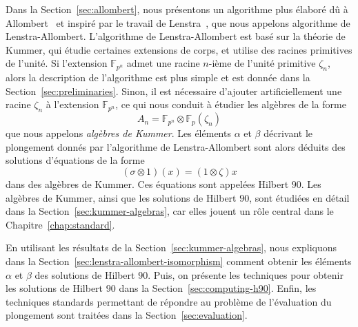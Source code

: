 Dans la Section~\ref{sec:allombert}, nous présentons un algorithme plus élaboré
dû à Allombert~\cite{Allombert02} et inspiré par le travail de
Lenstra~\cite{Lenstra91}, que nous appelons algorithme de Lenstra-Allombert.
L'algorithme de Lenstra-Allombert est basé sur la théorie de Kummer, qui étudie
certaines extensions de corps, et utilise des racines primitives de l'unité. Si
l'extension $\mathbb{F}_{p^{n}}$ admet une racine $n$-ième de l'unité primitive
$\zeta_n$,
alors la description de l'algorithme est plus simple et est donnée dans la
Section~\ref{sec:preliminaries}. Sinon, il est nécessaire d'ajouter
artificiellement une racine $\zeta_n$ à l'extension $\mathbb{F}_{p^{n}}$, ce qui
nous conduit à étudier les algèbres de la forme
\[
  A_n = \mathbb{F}_{p^{n}}\otimes\mathbb{F}_p(\zeta_n)
\]
que nous appelons \emph{algèbres de Kummer}. Les éléments $\alpha$ et $\beta$
décrivant le plongement donnés par l'algorithme de Lenstra-Allombert sont alors
déduits des solutions d'équations de la forme
\[
  (\sigma\otimes1)(x) = (1\otimes\zeta)x
\]
dans des algèbres de Kummer. Ces équations sont appelées Hilbert $90$. Les
algèbres de Kummer, ainsi que les solutions de Hilbert $90$, sont étudiées en
détail dans la Section~\ref{sec:kummer-algebras}, car elles jouent un rôle
central dans le Chapitre~\ref{chap:standard}.

En utilisant les résultats de la Section~\ref{sec:kummer-algebras}, nous
expliquons dans la Section~\ref{sec:lenstra-allombert-isomorphism} comment
obtenir les éléments $\alpha$ et $\beta$ des solutions de Hilbert $90$. Puis,
on présente les techniques pour obtenir les solutions de Hilbert $90$ dans la
Section~\ref{sec:computing-h90}. Enfin, les techniques standards permettant de
répondre au problème de l'évaluation du plongement sont traitées dans la
Section~\ref{sec:evaluation}.
%
